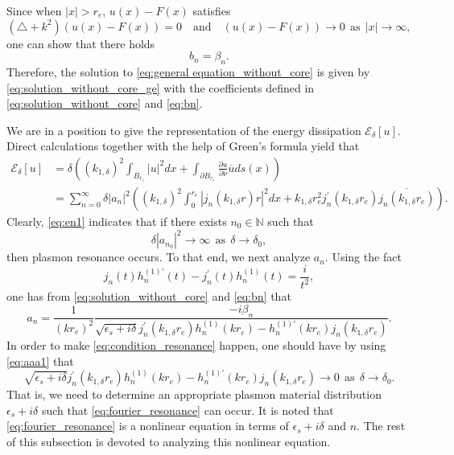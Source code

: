 \documentclass[11pt,reqno,twoside]{amsart}
\theoremstyle{definition}
\theoremstyle{remark}
\numberwithin{equation}{section}
\begin{document}
Since when $|x|>r_e$, $u(x)-F(x)$ satisfies
\begin{equation}\label{eq:r1}
(\triangle + k^2)(u(x)-F(x)) =0\quad\mbox{and}\quad  (u(x)-F(x))\rightarrow 0 \ \ \mbox{as}\ \ |x|\rightarrow \infty,
\end{equation}
one can show that there holds
\begin{equation}\label{eq:bn}
  b_n=\beta_n.
\end{equation}
Therefore, the solution to \eqref{eq:general equation_without_core} is given by \eqref{eq:solution_without_core_ge} with the coefficients defined in \eqref{eq:solution_without_core} and \eqref{eq:bn}.

 We are in a position to give the representation of the energy dissipation $\mathscr{E}_{\delta}[u]$. Direct calculations together with the help of Green's formula yield that
\begin{equation}\label{eq:en1}
 \begin{split}
   \mathscr{E}_{\delta}[u] & = \delta  \left( (k_{1,\delta})^2\int_{B_{r_e}}|u|^2 dx + \int_{\partial B_{r_e}}\frac{\partial u}{\partial\nu}\overline{u} ds(x)\right) \\
     & =\sum_{n=0}^{\infty}\delta |a_n|^2 \left( (k_{1,\delta})^2\int_{0}^{r_e}|j_n(k_{1,\delta}r)r|^2 dx + k_{1,\delta}r_e^2j_n^{\prime}(k_{1,\delta}r_e)\overline{j_n(k_{1,\delta}r_e)} \right).
 \end{split}
\end{equation}
Clearly, \eqref{eq:en1} indicates that if there exists $n_0\in\mathbb{N}$ such that
\begin{equation}\label{eq:condition_resonance}
 \delta |a_{n_0}|^2\rightarrow \infty\ \ \mbox{as}\ \ \delta\rightarrow\delta_0,
\end{equation}
then plasmon resonance occurs. To that end, we next analyze $a_n$. Using the fact
 \[
  j_n(t)h_n^{(1)\prime}(t)-j_n^{\prime}(t)h_n^{(1)}(t)=\frac{i}{t^2},
\]
one has from \eqref{eq:solution_without_core} and \eqref{eq:bn} that
\begin{equation}\label{eq:aaa1}
   a_n=\frac{1}{(kr_e)^2} \frac{-i \beta_n} {\sqrt{\epsilon_s+i\delta} j_n^{\prime}(k_{1,\delta} r_e)h_n^{(1)}(kr_e) - h_n^{(1)\prime}(kr_e)j_n(k_{1,\delta} r_e)  }.
\end{equation}
In order to make \eqref{eq:condition_resonance} happen, one should have by using \eqref{eq:aaa1} that
\begin{equation}\label{eq:fourier_resonance}
  \sqrt{\epsilon_s+i\delta} j_n^{\prime}(k_{1,\delta} r_e)h_n^{(1)}(kr_e) - h_n^{(1)\prime}(kr_e)j_n(k_{1,\delta} r_e)\rightarrow 0\ \ \mbox{as}\ \ \delta\rightarrow\delta_0.
\end{equation}
That is, we need to determine an appropriate plasmon material distribution $\epsilon_s+i\delta$ such that \eqref{eq:fourier_resonance} can occur. It is noted that \eqref{eq:fourier_resonance} is a nonlinear equation in terms of $\epsilon_s+i\delta$ and $n$. The rest of this subsection is devoted to analyzing this nonlinear equation.
\end{document}
